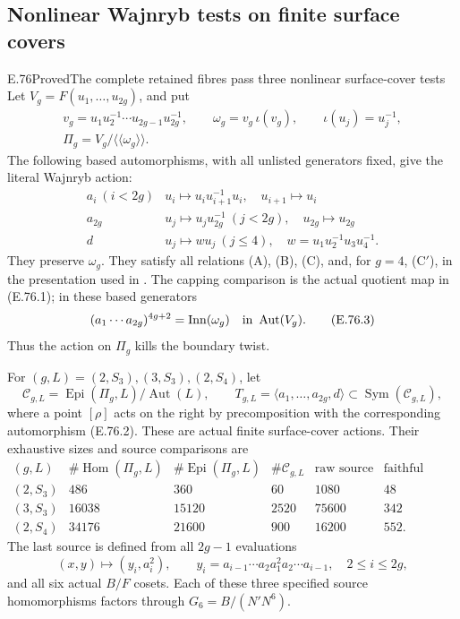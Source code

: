\subsection{Nonlinear Wajnryb tests on finite surface covers}
\begin{statement}{E.76}{Proved}{The complete retained fibres pass three nonlinear surface-cover tests}
Let $V_g=F(u_1,\ldots,u_{2g})$, and put
\[
 \begin{gathered}
 v_g=u_1u_2^{-1}\cdots u_{2g-1}u_{2g}^{-1},\qquad
 \omega_g=v_g\,\iota(v_g),\qquad \iota(u_j)=u_j^{-1},\\
 \Pi_g=V_g/\langle\!\langle\omega_g\rangle\!\rangle.
 \end{gathered}
 \tag{E.76.1}
\]
The following based automorphisms, with all unlisted generators fixed,
give the literal Wajnryb action:
\[
\begin{array}{c|l}
 a_i\ (i<2g)&u_i\mapsto u_i u_{i+1}^{-1}u_i,
                  \quad u_{i+1}\mapsto u_i\\
 a_{2g}&u_j\mapsto u_j u_{2g}^{-1}\ (j<2g),
                  \quad u_{2g}\mapsto u_{2g}\\
 d&u_j\mapsto w u_j\ (j\leq4),
                  \quad w=u_1u_2^{-1}u_3u_4^{-1}.
\end{array}
 \tag{E.76.2}
\]
They preserve $\omega_g$.  They satisfy all relations (A), (B), (C),
and, for $g=4$, (C$'$), in the presentation used in
\cite[Theorem 3.1]{DE_LochakNakamuraSchneps2026}.  The capping comparison
is the actual quotient map in (E.76.1); in these based generators
\[
       (a_1\cdots a_{2g})^{4g+2}
                 =\operatorname{Inn}(\omega_g)
                    \quad\hbox{in }\operatorname{Aut}(V_g).
 \tag{E.76.3}
\]
Thus the action on $\Pi_g$ kills the boundary twist.

For $(g,L)=(2,S_3),(3,S_3),(2,S_4)$, let
\[
 \mathscr C_{g,L}
    =\operatorname{Epi}(\Pi_g,L)/\operatorname{Aut}(L),
 \qquad
 T_{g,L}=\langle a_1,\ldots,a_{2g},d\rangle
           \subset\operatorname{Sym}(\mathscr C_{g,L}),
 \tag{E.76.4}
\]
where a point $[\rho]$ acts on the right by precomposition with
the corresponding automorphism (E.76.2).  These are actual finite
surface-cover actions. Their exhaustive sizes and source comparisons
are
\[
\begin{array}{c|r|r|r|r|r}
 (g,L)&\#\operatorname{Hom}(\Pi_g,L)&
 \#\operatorname{Epi}(\Pi_g,L)&\#\mathscr C_{g,L}&
 \text{raw source degree}&\text{faithful source degree}\\ \hline
 (2,S_3)&486&360&60&1080&48\\
 (3,S_3)&16038&15120&2520&75600&342\\
 (2,S_4)&34176&21600&900&16200&552.
\end{array}
 \tag{E.76.5}
\]
The last source is defined from all $2g-1$ evaluations
\[
 (x,y)\longmapsto
    (y_i,a_i^2),\qquad
 y_i=a_{i-1}\cdots a_2 a_1^2a_2\cdots a_{i-1},
             \quad 2\leq i\leq2g,
 \tag{E.76.6}
\]
and all six actual $B/F$ cosets.  Each of these three specified
source homomorphisms factors through $G_6=B/(N'N^6)$.


\end{statement}
